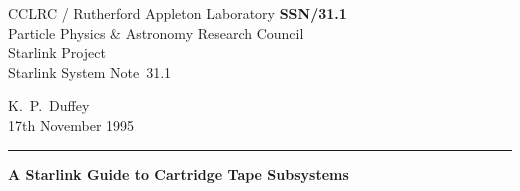 \documentclass[11pt]{article}
\newcommand{\stardoccategory}  {Starlink System Note}
\newcommand{\stardocinitials}  {SSN}
\newcommand{\stardocnumber}    {31.1}
\newcommand{\stardocauthors}   {K.\, P.\, Duffey}
\newcommand{\stardocdate}      {17th November 1995}
\newcommand{\stardoctitle}     {A Starlink Guide to Cartridge Tape Subsystems}
\newcommand{\stardocname}{\stardocinitials /\stardocnumber}
\newenvironment{latexonly}{}{}
\begin{document}
\thispagestyle{empty}

\begin{latexonly}
   CCLRC / {\sc Rutherford Appleton Laboratory} \hfill {\bf \stardocname}\\
   {\large Particle Physics \& Astronomy Research Council}\\
   {\large Starlink Project\\}
   {\large \stardoccategory\ \stardocnumber}
   \begin{flushright}
   \stardocauthors\\
   \stardocdate
   \end{flushright}
   \vspace{-4mm}
   \rule{\textwidth}{0.5mm}
   \vspace{5mm}
   \begin{center}
   {\Large\bf \stardoctitle}
   \end{center}
   \vspace{5mm}

\end{latexonly}
\end{document}
